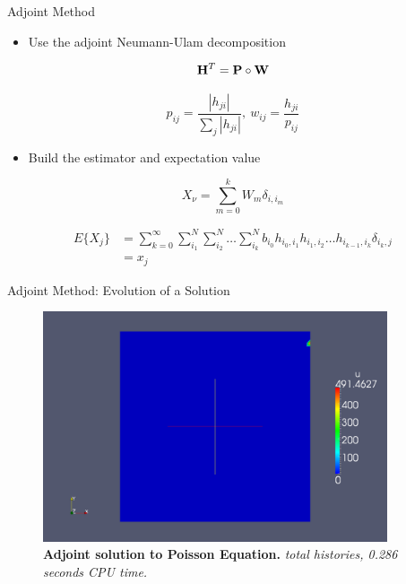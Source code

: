 \documentclass{beamer}
\begin{document}
\begin{frame}{Adjoint Method}

  \begin{itemize}
  \item Use the adjoint Neumann-Ulam decomposition
  \end{itemize}

  \[
  \mathbf{H}^{T} = \mathbf{P} \circ \mathbf{W}
  \]

  \[
  p_{ij} = \frac{|h_{ji}|}{\sum_j |h_{ji}|},\ w_{ij} =
  \frac{h_{ji}}{p_{ij}}
  \]

  \medskip
  \begin{itemize}
  \item Build the estimator and expectation value
  \end{itemize}

  \[
  X_{\nu} = \sum_{m=0}^k W_{m} \delta_{i,i_m}
  \]

  \[
  \begin{split}
    E\{X_j\} &=\sum_{k=0}^{\infty}\sum_{i_1}^{N}\sum_{i_2}^{N}\ldots
    \sum_{i_k}^{N} b_{i_0} h_{i_0,i_1}h_{i_1,i_2}\ldots h_{i_{k-1},i_k}
    \delta_{i_k,j} \\ &= x_{j}
  \end{split}
  \]

\end{frame}

\begin{frame}{Adjoint Method: Evolution of a Solution}

  \begin{figure}[h!]
    \begin{center}
      \includegraphics[width=4in]{adjoint_1.png}
    \end{center}
    \caption{\textbf{Adjoint solution to Poisson Equation.}
      \textit{ total histories, 0.286 seconds CPU time.} }
  \end{figure}

\end{frame}
\end{document}
